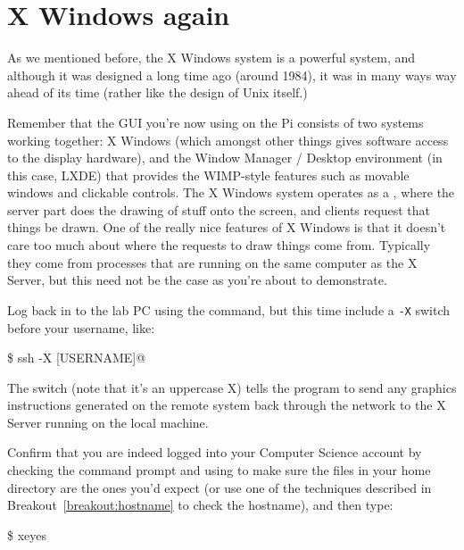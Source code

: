 \section{X Windows again}

As we mentioned before, the X Windows system is a powerful system, and
although it was designed a long time ago (around 1984), it was in many
ways way ahead of its time (rather like the design of Unix itself.)

Remember that the GUI you're now using on the Pi consists of two
systems working together: X Windows (which amongst other things gives
software access to the display hardware), and the Window Manager /
Desktop environment (in this case, LXDE) that provides the WIMP-style
features such as movable windows and clickable controls. The X Windows
system operates as a , where the
server part does the drawing of stuff onto the screen, and clients
request that things be drawn. One of the really nice features of X
Windows is that it doesn't care too much about where the requests to
draw things come from. Typically they come from processes that are
running on the same computer as the X Server, but this need not be the
case as you're about to demonstrate.

Log back in to the lab PC using the  command, but this
time include a \texttt{-X} switch before your username, like:

\begin{ttoutenv}
\$ ssh -X [USERNAME]\!@\![HOSTNAME]
\end{ttoutenv}

The  switch (note that it's an uppercase X) tells the
 program to send any graphics instructions generated on
the remote system back through the network to the X Server running on
the local machine.

Confirm that you are indeed logged into your Computer Science account
by checking the command prompt and using  to make sure
the files in your home directory are the ones you'd expect (or use one
of the techniques described in Breakout~\ref{breakout:hostname} to
check the hostname), and then type:

\begin{ttoutenv}
\$ xeyes
\end{ttoutenv}

